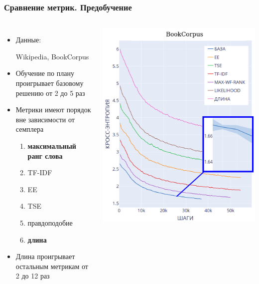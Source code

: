 \documentclass{beamer}
\begin{document}
\begin{frame}
	\frametitle{Сравнение метрик. Предобучение}
	\begin{columns}
			\begin{itemize}
				\item Данные: 
				
					Wikipedia, BookCorpus
				\item Обучение по плану проигрывает базовому решению от 2 до 5 раз
				\item Метрики имеют порядок вне зависимости от семплера
				\begin{enumerate}
					\item {\bf максимальный ранг слова}
					\item TF-IDF
					\item EE
					\item TSE
					\item правдоподобие
					\item {\bf длина}
				\end{enumerate}
				\item Длина проигрывает остальным метрикам от 2 до 12 раз
			\end{itemize}
			\includegraphics[scale=0.28]{BookCorpus_results}
	\end{columns}
\end{frame}
\end{document}
